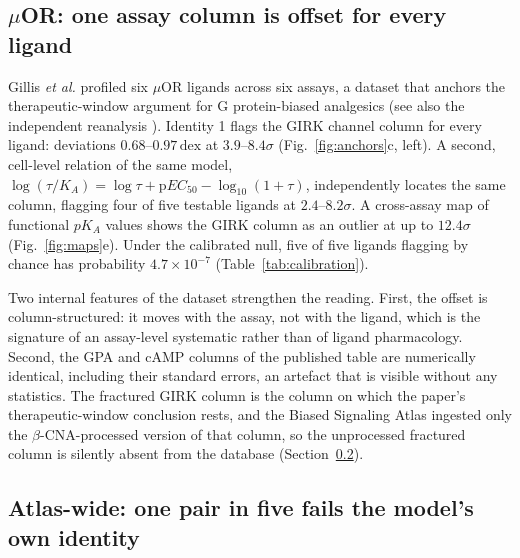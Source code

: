 ﻿\documentclass[11pt,a4paper]{article}
\newcommand{\dex}{\ensuremath{\,\mathrm{dex}}}
\newcommand{\pKA}{\ensuremath{p\!K_{\!A}}}
\newcommand{\logR}{\ensuremath{\log(\tau/K_{\!A})}}
\begin{document}
\subsection{$\mu$OR: one assay column is offset for every ligand}
\label{sec:mor}

Gillis \emph{et al.} \cite{Gillis2020} profiled six $\mu$OR ligands across six assays, a dataset that anchors the therapeutic-window argument for G protein-biased analgesics (see also the independent reanalysis \cite{StahlBohn2022}). Identity 1 flags the GIRK channel column for every ligand: deviations $0.68$--$0.97\dex$ at $3.9$--$8.4\sigma$ (Fig.~\ref{fig:anchors}c, left). A second, cell-level relation of the same model, $\logR=\log\tau+\mathrm{p}EC_{50}-\log_{10}(1+\tau)$, independently locates the same column, flagging four of five testable ligands at $2.4$--$8.2\sigma$. A cross-assay map of functional $\pKA$ values shows the GIRK column as an outlier at up to $12.4\sigma$ (Fig.~\ref{fig:maps}e). Under the calibrated null, five of five ligands flagging by chance has probability $4.7\times10^{-7}$ (Table~\ref{tab:calibration}).

Two internal features of the dataset strengthen the reading. First, the offset is column-structured: it moves with the assay, not with the ligand, which is the signature of an assay-level systematic rather than of ligand pharmacology. Second, the GPA and cAMP columns of the published table are numerically identical, including their standard errors, an artefact that is visible without any statistics. The fractured GIRK column is the column on which the paper's therapeutic-window conclusion rests, and the Biased Signaling Atlas ingested only the $\beta$-CNA-processed version of that column, so the unprocessed fractured column is silently absent from the database (Section~\ref{sec:atlas}).

\subsection{Atlas-wide: one pair in five fails the model's own identity}
\label{sec:atlas}
\end{document}
